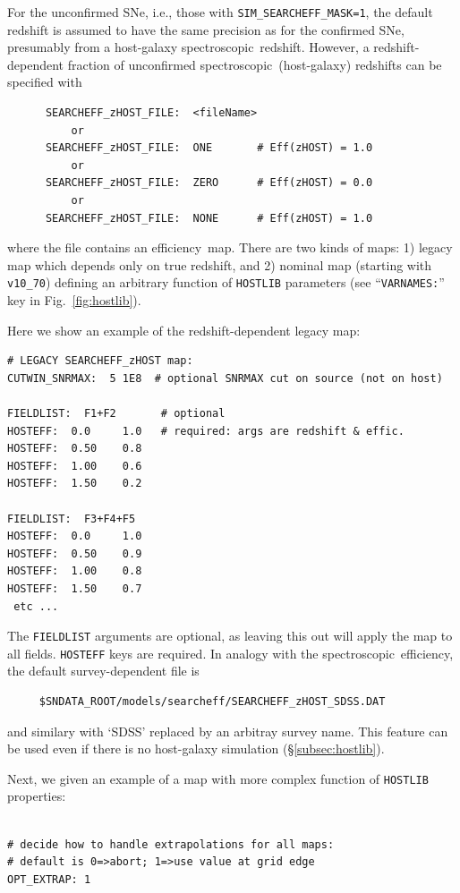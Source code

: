 \documentclass[12pt]{article}
\newcommand{\eff}{efficiency}
\newcommand{\spec}{spectroscopic}
\begin{document}
{For the unconfirmed SNe, i.e., those with {\tt SIM\_SEARCHEFF\_MASK=1},
the default redshift is assumed to have the same precision as for 
the confirmed SNe, presumably from a host-galaxy \spec\ redshift. 
However, a redshift-dependent fraction of unconfirmed 
\spec\ (host-galaxy) redshifts can be specified with
%
\begin{verbatim}
      SEARCHEFF_zHOST_FILE:  <fileName>
          or
      SEARCHEFF_zHOST_FILE:  ONE       # Eff(zHOST) = 1.0
          or
      SEARCHEFF_zHOST_FILE:  ZERO      # Eff(zHOST) = 0.0
          or
      SEARCHEFF_zHOST_FILE:  NONE      # Eff(zHOST) = 1.0
\end{verbatim}
%
where the file contains an \eff\ map.  There are two kinds of maps:
1) legacy map which depends only on true redshift, and 
2) nominal map (starting with {\tt v10\_70}) defining an arbitrary 
function of {\tt HOSTLIB} parameters
(see ``{\tt VARNAMES:}''  key in Fig.~\ref{fig:hostlib}).

Here we show an example of the redshift-dependent legacy map:
\begin{Verbatim}[frame=single]
# LEGACY SEARCHEFF_zHOST map:
CUTWIN_SNRMAX:  5 1E8  # optional SNRMAX cut on source (not on host)

FIELDLIST:  F1+F2       # optional 
HOSTEFF:  0.0     1.0   # required: args are redshift & effic.
HOSTEFF:  0.50    0.8
HOSTEFF:  1.00    0.6
HOSTEFF:  1.50    0.2

FIELDLIST:  F3+F4+F5
HOSTEFF:  0.0     1.0
HOSTEFF:  0.50    0.9
HOSTEFF:  1.00    0.8
HOSTEFF:  1.50    0.7
 etc ...
\end{Verbatim}                             
The {\tt FIELDLIST} arguments are optional, as leaving this out
will apply the map to all fields. {\tt HOSTEFF} keys are required.
In analogy with the \spec\ efficiency, the default 
survey-dependent file is
\begin{verbatim}
     $SNDATA_ROOT/models/searcheff/SEARCHEFF_zHOST_SDSS.DAT
\end{verbatim}
and similary with `SDSS' replaced by an arbitray survey name.
This feature can be used even if there is no host-galaxy 
simulation (\S\ref{subsec:hostlib}).

\clearpage
Next, we given an example of a map with more complex function
of {\tt HOSTLIB} properties:
%
\begin{Verbatim}[frame=single]

# decide how to handle extrapolations for all maps:
# default is 0=>abort; 1=>use value at grid edge
OPT_EXTRAP: 1               


\end{Verbatim}}
\end{document}
